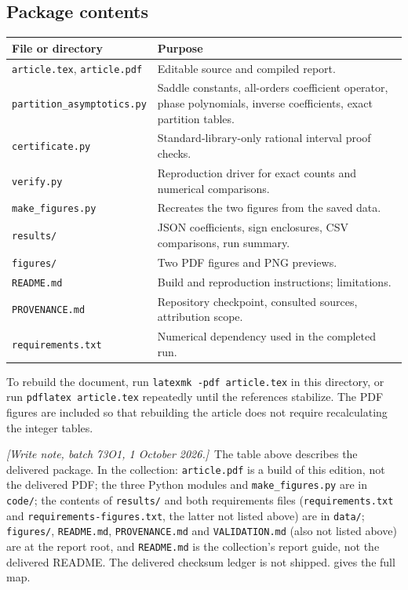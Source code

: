 \documentclass[11pt,a4paper]{article}
\numberwithin{equation}{section}
\theoremstyle{definition}
\theoremstyle{remark}
\newcommand{\writenote}[1]{\par\smallskip\noindent
 \textit{[Write note, batch 73O1, 1 October 2026.]}\ #1\par\smallskip}
\begin{document}
\subsection{Package contents}
\begin{center}
\small
\begin{tabularx}{\textwidth}{@{}lX@{}}
\toprule
File or directory & Purpose\\
\midrule
\texttt{article.tex}, \texttt{article.pdf} & Editable source and compiled report.\\
\texttt{partition\_asymptotics.py} & Saddle constants, all-orders coefficient
operator, phase polynomials, inverse coefficients, exact partition tables.\\
\texttt{certificate.py} & Standard-library-only rational interval proof checks.\\
\texttt{verify.py} & Reproduction driver for exact counts and numerical comparisons.\\
\texttt{make\_figures.py} & Recreates the two figures from the saved data.\\
\texttt{results/} & JSON coefficients, sign enclosures, CSV comparisons, run summary.\\
\texttt{figures/} & Two PDF figures and PNG previews.\\
\texttt{README.md} & Build and reproduction instructions; limitations.\\
\texttt{PROVENANCE.md} & Repository checkpoint, consulted sources, attribution scope.\\
\texttt{requirements.txt} & Numerical dependency used in the completed run.\\
\bottomrule
\end{tabularx}
\end{center}
To rebuild the document, run \texttt{latexmk -pdf article.tex} in this
directory, or run \texttt{pdflatex article.tex} repeatedly until the
references stabilize. The PDF figures are included so that rebuilding
the article does not require recalculating the integer tables.

\writenote{The table above describes the delivered package. In the
collection: \texttt{article.pdf} is a build of this edition, not the
delivered PDF; the three Python modules and \texttt{make\_figures.py}
are in \texttt{code/}; the contents of \texttt{results/} and both
requirements files (\texttt{requirements.txt} and
\texttt{requirements-figures.txt}, the latter not listed above) are in
\texttt{data/}; \texttt{figures/}, \texttt{README.md},
\texttt{PROVENANCE.md} and \texttt{VALIDATION.md} (also not listed
above) are at the report root, and \texttt{README.md} is the
collection's report guide, not the delivered README. The delivered
checksum ledger is not shipped. \Cref{srp:app:provenance} gives the
full map.}
\end{document}
